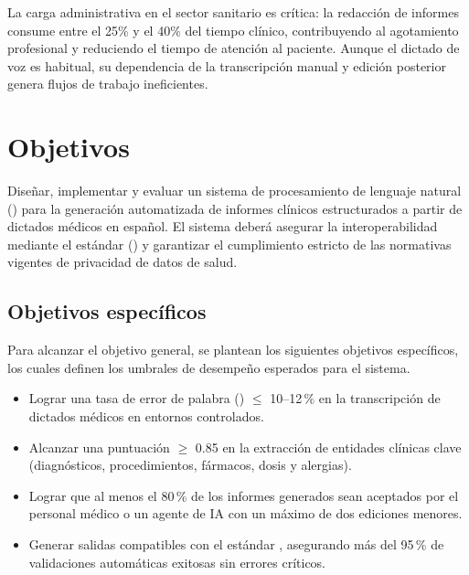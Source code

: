 La carga administrativa en el sector sanitario es crítica:
la redacción de informes consume entre el 25\% y el 40\% del tiempo clínico,
contribuyendo al agotamiento profesional y reduciendo el tiempo de atención al paciente.
Aunque el dictado de voz es habitual, su dependencia de la transcripción manual y 
edición posterior genera flujos de trabajo ineficientes.

\section{Objetivos}\label{section:objetivos}

Diseñar, implementar y evaluar un sistema de procesamiento de lenguaje natural () 
 para la generación automatizada de informes clínicos estructurados 
a partir de dictados médicos en español. El sistema deberá asegurar la interoperabilidad
mediante el estándar  () y garantizar el cumplimiento estricto
de las normativas vigentes de privacidad de datos de salud. 

\subsection{Objetivos específicos}\label{section:objetivos-especificos}

Para alcanzar el objetivo general, se plantean los siguientes objetivos específicos,
los cuales definen los umbrales de desempeño esperados para el sistema.

\begin{itemize}
    \item Lograr una tasa de error de palabra () $\le$ 10--12\,\% 
    en la transcripción de dictados médicos en entornos controlados.
    \item Alcanzar una puntuación  $\ge$ 0.85 en la extracción de entidades clínicas clave 
    (diagnósticos, procedimientos, fármacos, dosis y alergias).
    \item Lograr que al menos el 80\,\% de los informes generados sean aceptados por el personal médico o un agente de IA
    con un máximo de dos ediciones menores.
    \item Generar salidas compatibles con el estándar , asegurando más del 95\,\% de
    validaciones automáticas exitosas sin errores críticos.
\end{itemize}


